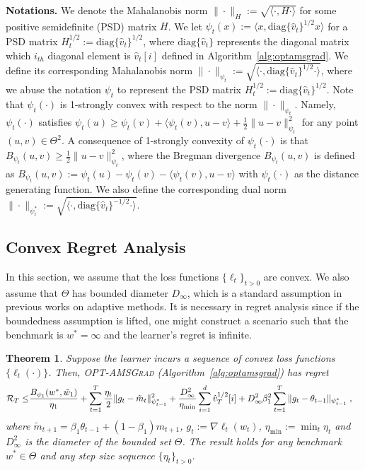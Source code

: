 \documentclass[11pt]{article}
\newtheorem{Theorem}{Theorem}
\theoremstyle{k}
\begin{document}
\textbf{Notations.}\hspace{0.1in}
We denote the Mahalanobis norm $\|\cdot\|_H := \sqrt{ \langle \cdot, H \cdot \rangle }$ for some positive semidefinite (PSD) matrix $H$.
We let $\psi_t(x) := \langle x, \text{diag}\{\hat{v}_t\}^{1/2} x \rangle$ for a PSD matrix $H_t^{1/2}:= \text{diag}\{\hat{v}_t\}^{1/2}$, where $\text{diag}\{\hat{v}_t\}$ represents the diagonal matrix which $i_{th}$ diagonal element is $\hat{v}_t[i]$ defined in Algorithm~\ref{alg:optamsgrad}.
We define its corresponding Mahalanobis norm $\| \cdot \|_{\psi_t}:=  \sqrt{ \langle \cdot, \text{diag}\{\hat{v}_t\}^{1/2} \cdot \rangle }$,
where we abuse the notation $\psi_t$ to represent the PSD matrix $H_t^{1/2}:=\text{diag}\{\hat{v}_t\}^{1/2}$.
Note that $\psi_t(\cdot)$ is 1-strongly convex with respect to the norm $\| \cdot \|_{\psi_t}$.
Namely, $\psi_t(\cdot)$ satisfies $\psi_t(u) \geq \psi_t(v) + \langle \psi_t(v), u - v \rangle + \frac{1}{2} \| u - v\|^2_{\psi_t}$ for any point $(u,v) \in \Theta^2$.
A consequence of 1-strongly convexity of $\psi_t(\cdot)$ is that $B_{\psi_t}(u,v) \geq \frac{1}{2} \| u - v \|^2_{\psi_t}$, where the Bregman divergence $B_{\psi_t}(u,v)$ is defined as $B_{\psi_t}(u,v) := \psi_t(u) - \psi_t(v) - \langle \psi_t(v), u - v \rangle$ with $\psi_t(\cdot)$ as the distance generating function.
We also define the corresponding dual norm $\| \cdot \|_{\psi_t^*}:= \sqrt{ \langle \cdot, \text{diag}\{\hat{v}_t\}^{-1/2} \cdot \rangle }$.
\subsection{Convex Regret Analysis}
In this section, we assume that the loss functions $\{\ell_t\}_{t>0}$ are convex. 
We also assume that $\Theta$ has bounded diameter $D_{\infty}$, which is a standard assumption in previous works \citep{RKK18,KB15} on adaptive methods. It is necessary in regret analysis since if the boundedness assumption is lifted, one might construct a scenario such that the benchmark is $w^* = \infty$ and the learner's regret is infinite. 
\begin{Theorem} \label{thm:mainconvex}
Suppose the learner incurs a sequence of convex loss functions $\{ \ell_{t}(\cdot) \}$.
Then,  \textsc{OPT-AMSGrad} (Algorithm~\ref{alg:optamsgrad}) has regret 
\begin{equation} \notag
\begin{aligned}
\mathcal{R}_T \leq &   \frac{ B_{\psi_1}(w^*, \tilde{w}_{1})}{\eta_1}
+ \sum_{t=1}^T\frac{\eta_t}{2} \| g_t - \tilde{m}_t  \|_{\psi_{t-1}^*}^2  + \frac{D_{\infty}^2}{\eta_{\min}}  \sum_{i=1}^d \hat{v}_{T}^{1/2}[i] + D_{\infty}^2\beta_1^2   \sum_{t=1}^T  \| g_t - \theta_{t-1}  \|_{\psi_{t-1}^*}\;,
\end{aligned}
\end{equation}
where $ \tilde{m}_{t+1}  = \beta_1 \theta_{t-1} +(1-\beta_1) m_{t+1}$, $g_{t}:= \nabla \ell_{t}(w_t)$, $\eta_{{\min}} := \min_{{t}} \eta_{t}$ and $D_{\infty}^2$ is the diameter of the bounded set $\Theta$.
The result holds for any benchmark $w^{*} \in \Theta$ and any step size sequence $\{ \eta_t \}_{t>0}$.
\end{Theorem}
\end{document}
